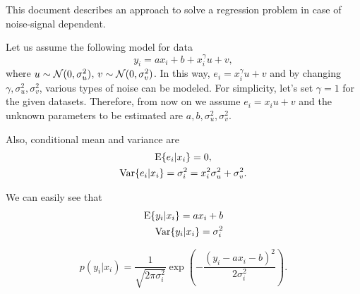 \documentclass[12pt]{elsarticle}
\newlength{\defbaselineskip}
\newcommand{\setlinespacing}[1]%
           {\setlength{\baselineskip}{#1 \defbaselineskip}}
\begin{document}
\setlinespacing{1.2}




This document describes an approach to solve a regression problem in case of noise-signal dependent.





Let us assume the following model for data
\begin{equation}
\label{eq:lin2}
y_i= a x_i + b + x_i^{\gamma} u+v, 
\end{equation}
where $u \sim \mathcal{N}(0, \sigma_u^2)$, $v \sim \mathcal{N}(0, \sigma_v^2)$. In this way, $e_i=x_i^{\gamma} u+v$ and by changing $\gamma,\sigma_u^2,\sigma_v^2$, various types of noise can be modeled. For simplicity, let's set $\gamma=1$ for the given datasets. Therefore, from now on we assume $e_i=x_i u+v$ and the unknown parameters to be estimated are $a,b,\sigma_u^2,\sigma_v^2$.

Also, conditional mean and variance are
\begin{gather}
\label{eq:var1}
{\mathrm {E}}\{e_i|x_i\}=0, \\
{\mathrm {Var}}\{e_i|x_i\} =\sigma_i^2= x_i^{2} \sigma_u^2+\sigma_v^2.
\end{gather}


We can easily see that
\begin{align}
{\mathrm {E}}\{y_i| x_i \}= a x_i+b \\
{\mathrm {Var}}\{ y_i | x_i\}= \sigma_i^2
\end{align}

\begin{equation}
\label{eq:yipdf}
p(y_i|x_i)= \frac{1}{\sqrt{2\pi \sigma_i^2}} \exp\left(  - \frac{(y_i- ax_i-b)^2}{2\sigma_i^2} \right).
\end{equation}
\end{document}
